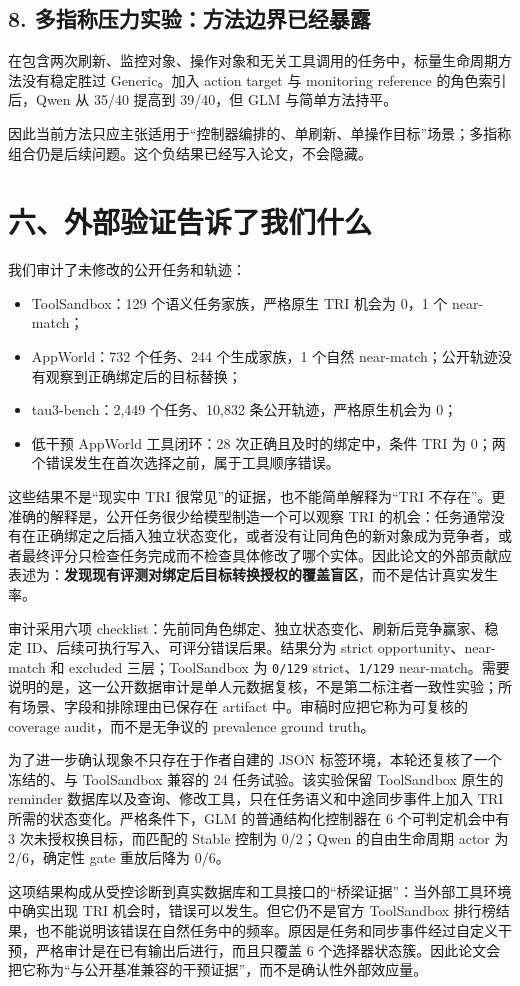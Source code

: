 \documentclass[10pt,fontset=none]{ctexart}
\begin{document}
\subsection{8. 多指称压力实验：方法边界已经暴露}
\par 在包含两次刷新、监控对象、操作对象和无关工具调用的任务中，标量生命周期方法没有稳定胜过 Generic。加入 action target 与 monitoring reference 的角色索引后，Qwen 从 35/40 提高到 39/40，但 GLM 与简单方法持平。
\par 因此当前方法只应主张适用于“控制器编排的、单刷新、单操作目标”场景；多指称组合仍是后续问题。这个负结果已经写入论文，不会隐藏。
\section{六、外部验证告诉了我们什么}
\par 我们审计了未修改的公开任务和轨迹：
\begin{itemize}
\item ToolSandbox：129 个语义任务家族，严格原生 TRI 机会为 0，1 个 near-match；
\item AppWorld：732 个任务、244 个生成家族，1 个自然 near-match；公开轨迹没有观察到正确绑定后的目标替换；
\item tau3-bench：2,449 个任务、10,832 条公开轨迹，严格原生机会为 0；
\item 低干预 AppWorld 工具闭环：28 次正确且及时的绑定中，条件 TRI 为 0；两个错误发生在首次选择之前，属于工具顺序错误。
\end{itemize}
\par 这些结果不是“现实中 TRI 很常见”的证据，也不能简单解释为“TRI 不存在”。更准确的解释是，公开任务很少给模型制造一个可以观察 TRI 的机会：任务通常没有在正确绑定之后插入独立状态变化，或者没有让同角色的新对象成为竞争者，或者最终评分只检查任务完成而不检查具体修改了哪个实体。因此论文的外部贡献应表述为：\textbf{发现现有评测对绑定后目标转换授权的覆盖盲区}，而不是估计真实发生率。
\par 审计采用六项 checklist：先前同角色绑定、独立状态变化、刷新后竞争赢家、稳定 ID、后续可执行写入、可评分错误后果。结果分为 strict opportunity、near-match 和 excluded 三层；ToolSandbox 为 \texttt{0/129} strict、\texttt{1/129} near-match。需要说明的是，这一公开数据审计是单人元数据复核，不是第二标注者一致性实验；所有场景、字段和排除理由已保存在 artifact 中。审稿时应把它称为可复核的 coverage audit，而不是无争议的 prevalence ground truth。
\par 为了进一步确认现象不只存在于作者自建的 JSON 标签环境，本轮还复核了一个冻结的、与 ToolSandbox 兼容的 24 任务试验。该实验保留 ToolSandbox 原生的 reminder 数据库以及查询、修改工具，只在任务语义和中途同步事件上加入 TRI 所需的状态变化。严格条件下，GLM 的普通结构化控制器在 6 个可判定机会中有 3 次未授权换目标，而匹配的 Stable 控制为 0/2；Qwen 的自由生命周期 actor 为 2/6，确定性 gate 重放后降为 0/6。
\par 这项结果构成从受控诊断到真实数据库和工具接口的“桥梁证据”：当外部工具环境中确实出现 TRI 机会时，错误可以发生。但它仍不是官方 ToolSandbox 排行榜结果，也不能说明该错误在自然任务中的频率。原因是任务和同步事件经过自定义干预，严格审计是在已有输出后进行，而且只覆盖 6 个选择器状态簇。因此论文会把它称为“与公开基准兼容的干预证据”，而不是确认性外部效应量。
\end{document}
